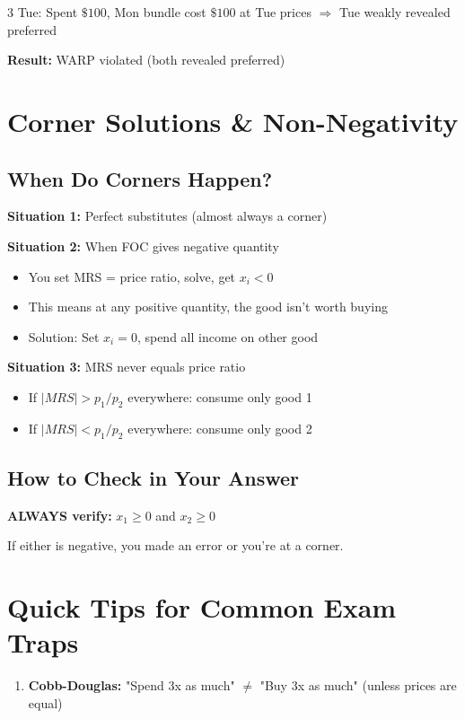 \documentclass[10pt,landscape]{article}
\begin{document}
\begin{multicols}{3}
Tue: Spent $\$100$, Mon bundle cost $\$100$ at Tue prices $\Rightarrow$ Tue weakly revealed preferred

\textbf{Result:} WARP violated (both revealed preferred)

\section{Corner Solutions \& Non-Negativity}

\subsection{When Do Corners Happen?}
\textbf{Situation 1:} Perfect substitutes (almost always a corner)

\textbf{Situation 2:} When FOC gives negative quantity
\begin{itemize}[leftmargin=*,noitemsep,topsep=0pt]
\item You set MRS = price ratio, solve, get $x_i < 0$
\item This means at any positive quantity, the good isn't worth buying
\item Solution: Set $x_i = 0$, spend all income on other good
\end{itemize}

\textbf{Situation 3:} MRS never equals price ratio
\begin{itemize}[leftmargin=*,noitemsep,topsep=0pt]
\item If $|MRS| > p_1/p_2$ everywhere: consume only good 1
\item If $|MRS| < p_1/p_2$ everywhere: consume only good 2
\end{itemize}

\subsection{How to Check in Your Answer}
\textbf{ALWAYS verify:} $x_1 \geq 0$ and $x_2 \geq 0$

If either is negative, you made an error or you're at a corner.

\section{Quick Tips for Common Exam Traps}

\begin{enumerate}[leftmargin=*,noitemsep,topsep=0pt]
\item \textbf{Cobb-Douglas:} "Spend 3x as much" $\neq$ "Buy 3x as much" (unless prices are equal)


\end{enumerate}
\end{multicols}
\end{document}
